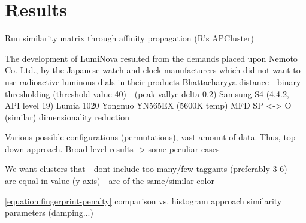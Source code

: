 \documentclass[thesis.tex]{subfiles}
\begin{document}
\chapter{Results}
\label{chapter:results}





Run similarity matrix through affinity propagation (R's APCluster)

The development of LumiNova resulted from the demands placed upon Nemoto  Co. Ltd.,  by the Japanese watch and clock manufacturers which did not want to use radioactive luminous dials in their products
Bhattacharyya distance
- binary thresholding (threshold value 40)
- (peak vallye delta 0.2)
Samsung S4 (4.4.2, API level 19)
Lumia 1020
Yongnuo YN565EX (5600K temp)
MFD
SP <-> O (similar)
dimensionality reduction

Various possible configurations (permutations), vast amount of data. Thus, top down approach. Broad level results -> some peculiar cases

We want clusters that
- dont include too many/few taggants (preferably 3-6)
- are equal in value (y-axis)
- are of the same/similar color

\ref{equation:fingerprint-penalty}
comparison vs. histogram approach
similarity parameters (damping...)
\end{document}
